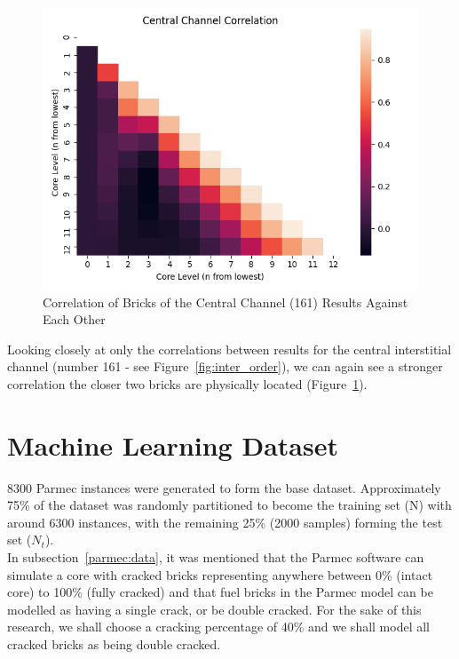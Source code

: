 \begin{figure}[h]
	\centering
	\includegraphics[scale=0.75]{Figures/central_channel_correlation.png}
	\caption{Correlation of Bricks of the Central Channel (161) Results Against Each Other}
	\label{fig:central_correlations}
\end{figure}


\noindent
Looking closely at only the correlations between results for the central interstitial channel (number 161 - see Figure~\ref{fig:inter_order}), we can again see a stronger correlation the closer two bricks are physically located (Figure~\ref{fig:central_correlations}).

\section{Machine Learning Dataset} \label{dataset}

8300 Parmec instances were generated to form the base dataset. Approximately 75\% of the dataset was randomly partitioned to become the training set (N) with around 6300 instances, with the remaining 25\% (2000 samples) forming the test set ($N_t$).  \\

\noindent
In subsection~\ref{parmec:data}, it was mentioned that the Parmec software can simulate  a core with cracked bricks representing anywhere between 0\%  (intact core) to 100\% (fully cracked) and that fuel bricks in the Parmec model can be modelled as having a single crack, or be double cracked. For the sake of this research, we shall choose a cracking percentage of 40\% and we shall model all cracked bricks as being double cracked. 


